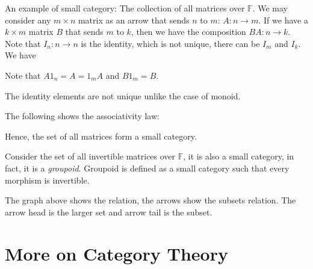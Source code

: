 \documentclass[
	11pt, %
	fleqn, %
	a4paper, %
]{LegrandOrangeBook}
\newcommand{\F}{\mathbb{F}} %
\begin{document}
An example of small category: The collection of all matrices over $\F$. We may consider any $m \times n$ matrix as an arrow that sends $n$ to $m$: $A : n \to m$. If we have a $k \times m$ matrix $B$ that sends $m$ to $k$, then we have the composition $BA : n \to k$. Note that $I_n : n \to n$ is the identity, which is not unique, there can be $I_m$ and $I_k$. We have 
\begin{center}
\end{center}
Note that $A 1_n = A = 1_m A$ and $B 1_m = B$. 

\begin{remark}
    The identity elements are not unique unlike the case of monoid.
\end{remark}

The following shows the associativity law:
\begin{center}
\end{center}

Hence, the set of all matrices form a small category.

Consider the set of all invertible matrices over $\F$, it is also a small category, in fact, it is a \emph{groupoid}. Groupoid is defined as a small category such that every morphism is invertible.

\begin{center}
\end{center}
The graph above shows the relation, the arrows show the subsets relation. The arrow head is the larger set and arrow tail is the subset.


\chapter{More on Category Theory}
\end{document}
